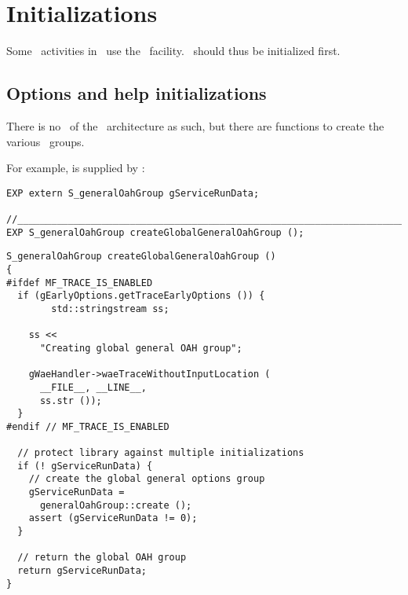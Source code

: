 



\chapter{Initializations}

Some \initialization\ activities in \mf\ use the \oahRepr\ facility. \oahRepr\ should thus be initialized first.


\section{Options and help initializations}

There is no \initialization\  of the \oahRepr\ architecture as such, but there are  functions to create the various \oahRepr\ groups.

For example,  is supplied by : %
\begin{lstlisting}[language=CPlusPlus]
EXP extern S_generalOahGroup gServiceRunData;

//______________________________________________________________________________
EXP S_generalOahGroup createGlobalGeneralOahGroup ();
\end{lstlisting}

\begin{lstlisting}[language=CPlusPlus]
S_generalOahGroup createGlobalGeneralOahGroup ()
{
#ifdef MF_TRACE_IS_ENABLED
  if (gEarlyOptions.getTraceEarlyOptions ()) {
		std::stringstream ss;

    ss <<
      "Creating global general OAH group";

    gWaeHandler->waeTraceWithoutInputLocation (
      __FILE__, __LINE__,
      ss.str ());
  }
#endif // MF_TRACE_IS_ENABLED

  // protect library against multiple initializations
  if (! gServiceRunData) {
    // create the global general options group
    gServiceRunData =
      generalOahGroup::create ();
    assert (gServiceRunData != 0);
  }

  // return the global OAH group
  return gServiceRunData;
}
\end{lstlisting}


